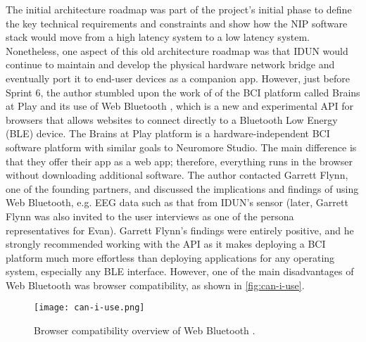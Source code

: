 The initial architecture roadmap was part of the project's initial phase to define the key technical requirements and constraints and show how the NIP software stack would move from a high latency system to a low latency system. Nonetheless, one aspect of this old architecture roadmap was that IDUN would continue to maintain and develop the physical hardware network bridge and eventually port it to end-user devices as a companion app. However, just before Sprint 6, the author stumbled upon the work of \citeauthor{flynn_brainsplay_nodate} of the BCI platform called Brains at Play and its use of Web Bluetooth \citep{brainsplay_add_nodate}, which is a new and experimental API for browsers that allows websites to connect directly to a Bluetooth Low Energy (BLE) device. The Brains at Play platform is a hardware-independent BCI software platform with similar goals to Neuromore Studio. The main difference is that they offer their app as a web app; therefore, everything runs in the browser without downloading additional software. The author contacted Garrett Flynn, one of the founding partners, and discussed the implications and findings of using Web Bluetooth, e.g. EEG data such as that from IDUN's sensor (later, Garrett Flynn was also invited to the user interviews as one of the persona representatives for Evan). Garrett Flynn's findings were entirely positive, and he strongly recommended working with the API as it makes deploying a BCI platform much more effortless than deploying applications for any operating system, especially any BLE interface. However, one of the main disadvantages of Web Bluetooth was browser compatibility, as shown in \autoref{fig:can-i-use}.

\begin{figure}[!ht]
  \centering
  \texttt{[image: can-i-use.png]}
  \caption[Browser compatibility overview of Web Bluetooth]{Browser compatibility overview of Web Bluetooth \citep{caniuse_web_nodate}.}
  \label{fig:can-i-use}
\end{figure}

